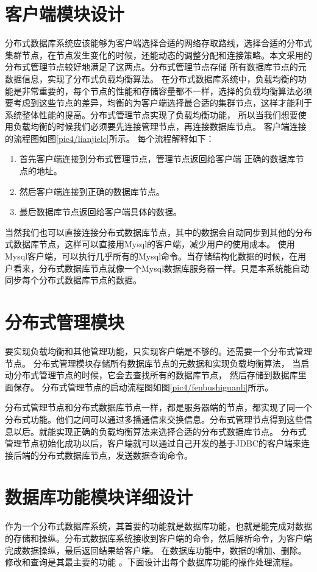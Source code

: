 \section{客户端模块设计}
分布式数据库系统应该能够为客户端选择合适的网络存取路线，选择合适的分布式集群节点，在节点发生变化的时候，还能动态的调整分配和连接策略。本文采用的分布式管理节点较好地满足了这两点。分布式管理节点存储
所有数据库节点的元数据信息，实现了分布式负载均衡算法。
在分布式数据库系统中，负载均衡的功能是非常重要的，每个节点的性能和存储容量都不一样，选择的负载均衡算法必须要考虑到这些节点的差异，均衡的为客户端选择最合适的集群节点，这样才能利于系统整体性能的提高。分布式管理节点实现了负载均衡功能，
所以当我们想要使用负载均衡的时候我们必须要先连接管理节点，再连接数据库节点。
客户端连接的流程图如图\ref{pic4/lianjielc}所示。
每个流程解释如下：
\begin{enumerate}[fullwidth,itemindent=2em,listparindent=2em]
	\item 首先客户端连接到分布式管理节点，管理节点返回给客户端
	正确的数据库节点的地址。
	\item 然后客户端连接到正确的数据库节点。
	\item 最后数据库节点返回给客户端具体的数据。
\end{enumerate}
当然我们也可以直接连接分布式数据库节点，其中的数据会自动同步到其他的分布式数据库节点，这样可以直接用Mysql的客户端，减少用户的使用成本。
使用Mysql客户端，可以执行几乎所有的Mysql命令。当存储结构化数据的时候，在用户看来，分布式数据库节点就像一个Mysql数据库服务器一样。只是本系统能自动同步每个分布式数据库节点的数据。
\section{分布式管理模块}
要实现负载均衡和其他管理功能，只实现客户端是不够的。还需要一个分布式管理节点。
分布式管理模块存储所有数据库节点的元数据和实现负载均衡算法，
当启动分布式管理节点的时候，它会去查找所有的数据库节点，
然后存储到数据库里面保存。
分布式管理节点的启动流程图如图\ref{pic4/fenbushiguanli}所示。

分布式管理节点和分布式数据库节点一样，都是服务器端的节点，都实现了同一个分布式功能。他们之间可以通过多播通信来交换信息。分布式管理节点得到这些信息以后。就能实现正确的负载均衡算法来选择合适的分布式数据库节点。
分布式管理节点初始化成功以后，客户端就可以通过自己开发的基于JDBC的客户端来连接后端的分布式数据库节点，发送数据查询命令。
\section{数据库功能模块详细设计}
作为一个分布式数据库系统，其首要的功能就是数据库功能，也就是能完成对数据的存储和操纵。分布式数据库系统接收到客户端的命令，然后解析命令，为客户端完成数据操纵，最后返回结果给客户端。
在数据库功能中，数据的增加、删除。修改和查询是其最主要的功能
。下面设计出每个数据库功能的操作处理流程。
